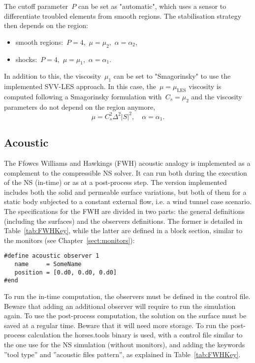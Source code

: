 \documentclass[a4paper,10pt]{report}
\begin{document}
The cutoff parameter~$P$ can be set as "automatic", which uses a sensor to differentiate troubled elements from smooth regions. The stabilisation strategy then depends on the region:
%
\begin{itemize}
    \item smooth regions:~$P=4$,~$\mu=\mu_2$,~$\alpha=\alpha_2$,
    \item shocks:~$P=4$,~$\mu=\mu_1$,~$\alpha=\alpha_1$.
\end{itemize}

In addition to this, the viscosity~$\mu_1$ can be set to "Smagorinsky" to use the implemented SVV-LES approach. In this case, the~$\mu=\mu_{\text{LES}}$ viscosity is computed following a Smagorinsky formulation with~$C_s=\mu_2$ and the viscosity parameters do not depend on the region anymore,
%
\begin{equation*}
    \mu = C_s^2 \Delta^2|S|^2, \quad \alpha = \alpha_1.
\end{equation*}

\subsection{Acoustic}
The Ffowcs Williams and Hawkings (FWH) acoustic analogy is implemented as a complement to the compressible NS solver. It can run both during the execution of the NS (in-time) or as at a post-process step. The version implemented includes both the solid and permeable surface variations, but both of them for a static body subjected to a constant external flow, i.e. a wind tunnel case scenario. The specifications for the FWH are divided in two parts: the general definitions (including the surfaces) and the observers definitions. The former is detailed in Table~\ref{tab:FWHKey}, while the latter are defined in a block section, similar to the monitors (see Chapter~\ref{sect:monitors}):

\begin{lstlisting}
#define acoustic observer 1
   name     = SomeName
   position = [0.d0, 0.d0, 0.d0]
#end
\end{lstlisting}

To run the in-time computation, the observers must be defined in the control file. Beware that adding an additional observer will require to run the simulation again. To use the post-process computation, the solution on the surface must be saved at a regular time. Beware that it will need more storage. To run the post-process calculation the horses.tools binary is used, with a control file similar to the one use for the NS simulation (without monitors), and adding the keywords ''tool type'' and ''acoustic files pattern'', as explained in Table~\ref{tab:FWHKey}.
\end{document}
